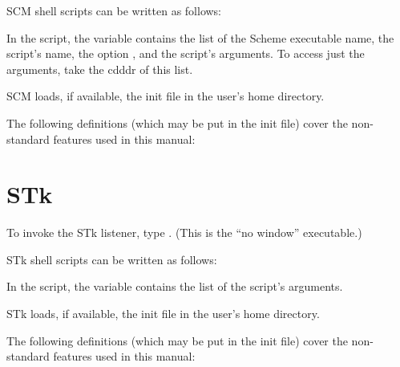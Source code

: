 SCM shell scripts can be written as follows:


In the script, the variable  contains the
list of the Scheme executable name, the script's name,
the option , and the script's arguments.  To
access just the arguments, take the cdddr of this list.

SCM loads, if available, the init file  in
the user's home directory.

The following definitions (which may be put in the init
file) cover the non-standard features used in this
manual:


\section{STk}

To invoke the STk listener, type .  (This is
the ``no window'' executable.)

STk shell scripts can be written as follows:


In the script, the variable  contains the
list of the script's arguments.

STk loads, if available, the init file  in
the user's home directory.

The following definitions (which may be put in the init
file) cover the non-standard features used in this
manual:

